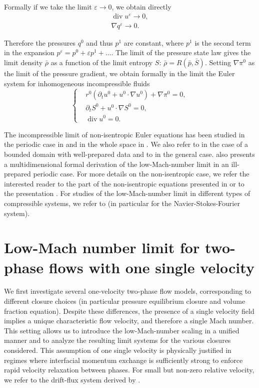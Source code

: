 \documentclass[11pt, twoside, a4paper]{article}
\theoremstyle{plain}
\theoremstyle{remark}
\numberwithin{equation}{section}
\renewcommand{\div}{\operatorname{div}}
\newcommand{\dt}{\partial_t}
\newcommand{\eps}{\varepsilon}
\begin{document}
Formally if we take the limit $\eps \to 0$, we obtain directly
\begin{align*}
    \div u^\eps \to 0,\\
    \nabla q^\eps \to 0.
\end{align*}

Therefore the pressures $q^0$ and thus $p^1$ are constant, where $p^1$ is the second term in the expansion $p^\eps=p^0+\eps p^1+\dots$. The limit of the pressure state law gives the limit density $\bar{\rho}$ as a function of the limit entropy $S$: $\bar{\rho} = R(\bar{p}, \bar{S})$. Setting $\nabla \pi^0$ as the limit of the pressure gradient, we obtain formally in the limit the Euler system for inhomogeneous incompressible fluids
\begin{equation*}
\left\{
    \begin{aligned}
        &r^0 (\dt u^0 + u^0 \cdot \nabla u^0) + \nabla \pi^0 = 0,\\
        &\dt S^0 + u^0 \cdot \nabla S^0 =0,\\
        &\div u^0 = 0. 
    \end{aligned}
\right.
\end{equation*}

The incompressible limit of non-isentropic Euler equations has been studied in the periodic case in \cite{metivier2003averaging} and in the whole space in \cite{metivier2001incompressible}. We also refer to \cite{schochet1986compressible} in the case of a bounded domain with well-prepared data and to \cite{alazard2005incompressible} in the general case. \cite{bresch2002low} also presents a multidimensional formal derivation of the low-Mach-number limit in an ill-prepared periodic case. For more details on the non-isentropic case, we refer the interested reader to the part of the non-isentropic equations presented in \cite{gallagher2005resultats} or to the presentation \cite{metivier2001limite}. For studies of the low-Mach-number limit in different types of compressible systems, we refer to \cite{lions1996mathematical} (in particular for the Navier-Stokes-Fourier system).



\section{Low-Mach number limit for two-phase flows with one single velocity}\label{sec2P1U}

We first investigate several one-velocity two-phase flow models, corresponding to different closure choices (in particular pressure equilibrium closure and volume fraction equation). Despite these differences, the presence of a single velocity field implies a unique characteristic flow velocity, and therefore a single Mach number. This setting allows us to introduce the low-Mach-number scaling in a unified manner and to analyze the resulting limit systems for the various closures considered. This assumption of one single velocity is physically justified in regimes where interfacial momentum exchange is sufficiently strong to enforce rapid velocity relaxation between phases. For small but non-zero relative velocity, we refer to the drift-flux system derived by \cite{ambroso2008drift,gastaldo2010scheme,gastaldo2011discretization}.
\end{document}

